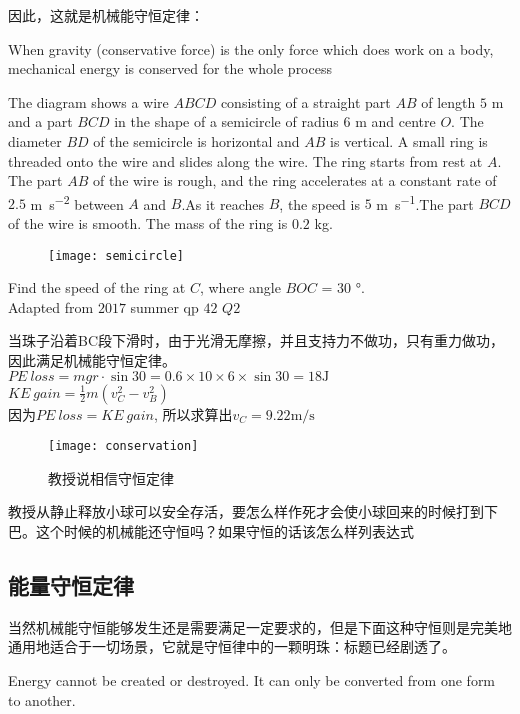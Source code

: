 因此，这就是机械能守恒定律：
\begin{theorem}
 When gravity (conservative force) is the only force which does work on a body, mechanical energy is conserved for the whole process
\end{theorem}


\begin{ExampleBox}
The diagram shows a wire $ABCD$ consisting of a straight part $AB$ of length $5$ \si{\m} and a part $BCD$ in the shape of a semicircle of radius $6$ \si{\m} and centre $O$. The diameter $BD$ of the semicircle is horizontal and $AB$ is vertical. A small ring is threaded onto the wire and slides along the wire. The ring starts from rest at $A$. The part $AB$ of the wire is rough, and the ring accelerates at a constant rate of $2.5$ \si{\m \per\square \s}  between $A$ and $B$.As it reaches $B$, the speed is $5$ \si{\m\per\s}.The part $BCD$ of the wire is smooth. The mass of the ring is $0.2$ \si{\kg}.
\begin{figure}[H]
\centering
\texttt{[image: semicircle]}
\end{figure}
Find the speed of the ring at $C$, where angle $BOC$ = $30$ \si{\degree}.\\
\makebox{}\hfill Adapted from $2017$ summer qp $42$ $Q2$

\tcblower
当珠子沿着BC段下滑时，由于光滑无摩擦，并且支持力不做功，只有重力做功，因此满足机械能守恒定律。\\
$PE \ loss = mgr\cdot \sin 30=0.6\times 10 \times 6 \times \sin 30=18\si{\J}$\\
$KE \ gain =\frac{1}{2}m(v_C^2-v_B^2)$\\
因为$PE \ loss=KE \ gain$, 所以求算出$v_C=9.22\si{\m\per\s}$
\end{ExampleBox}

\begin{figure}[H]
\centering
\texttt{[image: conservation]}
\caption{教授说相信守恒定律}
\end{figure}

\begin{TaskBox}
教授从静止释放小球可以安全存活，要怎么样作死才会使小球回来的时候打到下巴。这个时候的机械能还守恒吗？如果守恒的话该怎么样列表达式
\end{TaskBox}

\subsection*{能量守恒定律}
当然机械能守恒能够发生还是需要满足一定要求的，但是下面这种守恒则是完美地通用地适合于一切场景，它就是守恒律中的一颗明珠：标题已经剧透了。
\begin{theorem}
 Energy cannot be created or destroyed. It can only be converted from one form to another.
\end{theorem}

